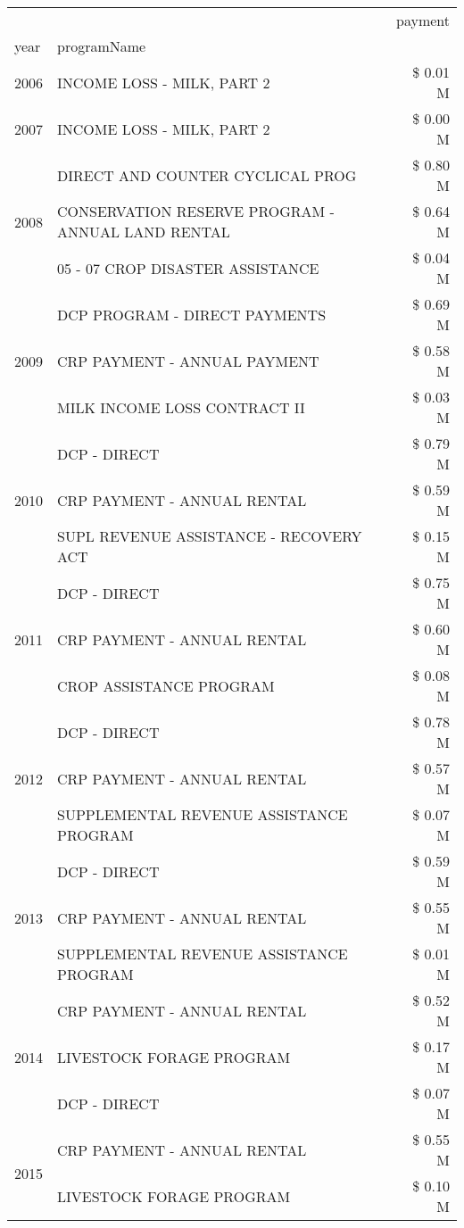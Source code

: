\begin{tabular}{llr}
\toprule
 &  & payment \\
year & programName &  \\
\midrule
2006 & INCOME LOSS - MILK, PART 2 & \$ 0.01 M \\
\cline{1-3}
2007 & INCOME LOSS - MILK, PART 2 & \$ 0.00 M \\
\cline{1-3}
\multirow[t]{3}{*}{2008} & DIRECT AND COUNTER CYCLICAL PROG & \$ 0.80 M \\
 & CONSERVATION RESERVE PROGRAM - ANNUAL LAND RENTAL & \$ 0.64 M \\
 & 05 - 07 CROP DISASTER ASSISTANCE & \$ 0.04 M \\
\cline{1-3}
\multirow[t]{3}{*}{2009} & DCP PROGRAM - DIRECT PAYMENTS & \$ 0.69 M \\
 & CRP PAYMENT - ANNUAL PAYMENT & \$ 0.58 M \\
 & MILK INCOME LOSS CONTRACT II & \$ 0.03 M \\
\cline{1-3}
\multirow[t]{3}{*}{2010} & DCP - DIRECT & \$ 0.79 M \\
 & CRP PAYMENT - ANNUAL RENTAL & \$ 0.59 M \\
 & SUPL REVENUE ASSISTANCE - RECOVERY ACT & \$ 0.15 M \\
\cline{1-3}
\multirow[t]{3}{*}{2011} & DCP - DIRECT & \$ 0.75 M \\
 & CRP PAYMENT - ANNUAL RENTAL & \$ 0.60 M \\
 & CROP ASSISTANCE PROGRAM & \$ 0.08 M \\
\cline{1-3}
\multirow[t]{3}{*}{2012} & DCP - DIRECT & \$ 0.78 M \\
 & CRP PAYMENT - ANNUAL RENTAL & \$ 0.57 M \\
 & SUPPLEMENTAL REVENUE ASSISTANCE PROGRAM & \$ 0.07 M \\
\cline{1-3}
\multirow[t]{3}{*}{2013} & DCP - DIRECT & \$ 0.59 M \\
 & CRP PAYMENT - ANNUAL RENTAL & \$ 0.55 M \\
 & SUPPLEMENTAL REVENUE ASSISTANCE PROGRAM & \$ 0.01 M \\
\cline{1-3}
\multirow[t]{3}{*}{2014} & CRP PAYMENT - ANNUAL RENTAL & \$ 0.52 M \\
 & LIVESTOCK FORAGE PROGRAM & \$ 0.17 M \\
 & DCP - DIRECT & \$ 0.07 M \\
\cline{1-3}
\multirow[t]{3}{*}{2015} & CRP PAYMENT - ANNUAL RENTAL & \$ 0.55 M \\
 & LIVESTOCK FORAGE PROGRAM & \$ 0.10 M \\

\end{tabular}

